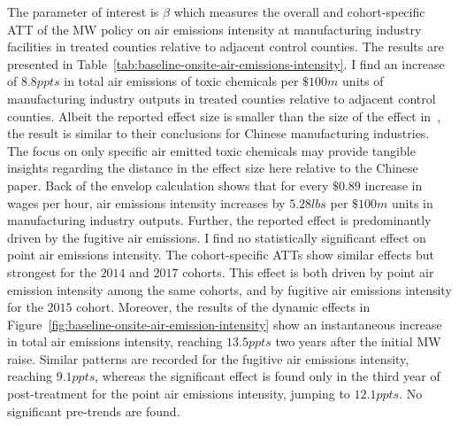 \documentclass[12pt, english]{article}
\begin{document}
    The parameter of interest is $\beta$ which measures the overall and cohort-specific ATT of the MW policy on air emissions intensity at manufacturing industry facilities in treated counties relative to adjacent control counties. The results are presented in Table~\ref{tab:baseline-onsite-air-emissions-intensity}. I find an increase of $8.8ppts$ in total air emissions of toxic chemicals per $\$100m$ units of manufacturing industry outputs in treated counties relative to adjacent control counties. Albeit the reported effect size is smaller than the size of the effect in~\cite{zhang2023unintended}, the result is similar to their conclusions for Chinese manufacturing industries. The focus on only specific air emitted toxic chemicals may provide tangible insights regarding the distance in the effect size here relative to the Chinese paper. Back of the envelop calculation shows that for every $\$0.89$ increase in wages per hour, air emissions intensity increases by $5.28lbs$ per $\$100m$ units in manufacturing industry outputs. Further, the reported effect is predominantly driven by the fugitive air emissions. I find no statistically significant effect on point air emissions intensity. The cohort-specific ATTs show similar effects but strongest for the $2014$ and $2017$ cohorts. This effect is both driven by point air emission intensity among the same cohorts, and by fugitive air emissions intensity for the $2015$ cohort. Moreover, the results of the dynamic effects in Figure~\ref{fig:baseline-onsite-air-emission-intensity} show an instantaneous increase in total air emissions intensity, reaching $13.5ppts$ two years after the initial MW raise. Similar patterns are recorded for the fugitive air emissions intensity, reaching $9.1ppts$, whereas the significant effect is found only in the third year of post-treatment for the point air emissions intensity, jumping to $12.1ppts$. No significant pre-trends are found.
    
\end{document}
